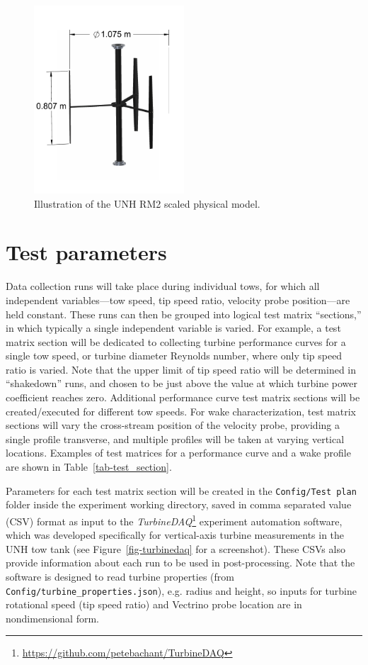 \documentclass[12pt,letterpaper]{scrreprt}
\begin{document}
\begin{figure}[ht]
\centering
\includegraphics[width=0.5\textwidth]{Figures/turbine}
\caption{Illustration of the UNH RM2 scaled physical model.}
\label{fig-turbine_drawing}
\end{figure}


\section{Test parameters}

Data collection runs will take place during individual tows, for which all
independent variables---tow speed, tip speed ratio, velocity probe
position---are held constant. These runs can then be grouped into logical test
matrix ``sections,'' in which typically a single independent variable is varied.
For example, a test matrix section will be dedicated to collecting turbine
performance curves for a single tow speed, or turbine diameter Reynolds number,
where only tip speed ratio is varied. Note that the upper limit of tip speed
ratio will be determined in ``shakedown'' runs, and chosen to be just above the
value at which turbine power coefficient reaches zero. Additional performance
curve test matrix sections will be created/executed for different tow speeds.
For wake characterization, test matrix sections will vary the cross-stream
position of the velocity probe, providing a single profile transverse, and
multiple profiles will be taken at varying vertical locations. Examples of test
matrices for a performance curve and a wake profile are shown in
Table~\ref{tab-test_section}.

Parameters for each test matrix section will be created in the
\texttt{Config/Test plan} folder inside the experiment working directory, saved
in comma separated value (CSV) format as input to the
\textit{TurbineDAQ}\footnote{\url{https://github.com/petebachant/TurbineDAQ}}
experiment automation software, which was developed specifically for
vertical-axis turbine measurements in the UNH tow tank (see
Figure~\ref{fig-turbinedaq} for a screenshot). These CSVs also provide
information about each run to be used in post-processing. Note that the software
is designed to read turbine properties (from
\texttt{Config/turbine\_properties.json}), e.g. radius and height, so inputs for
turbine rotational speed (tip speed ratio) and Vectrino probe location are in
nondimensional form.
\end{document}
